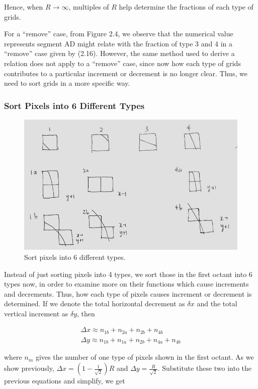 \documentclass[letterpaper]{article}
\numberwithin{equation}{section} %
\numberwithin{figure}{section} %
\numberwithin{table}{section} %
\begin{document}
\noindent
Hence, when $R \rightarrow \infty$, multiples of $R$ help determine the fractions of each type of grids. 



For a \enquote{remove} case, from Figure 2.4, we observe that the numerical value represents segment AD might relate with the fraction of type 3 and 4 in a \enquote{remove} case given by (2.16). However, the same method used to derive a relation does not apply to a \enquote{remove} case, since now how each type of grids contributes to a particular increment or decrement is no longer clear. Thus, we need to sort grids in a more specific way. 



\subsubsection{Sort Pixels into 6 Different Types}

\begin{figure}[h]
	\centering
	\includegraphics[width=0.5\linewidth]{6ty}
	\caption{Sort pixels into 6 different types.}
	\label{fig:6ty}
\end{figure}

Instead of just sorting pixels into 4 types, we sort those in the first octant into 6 types now, in order to examine more on their functions which cause increments and decrements. Thus, how each type of pixels causes increment or decrement is determined. If we denote the total horizontal decrement as $\delta x$ and the total vertical increment as $\delta y$, then

\begin{align} 
\Delta x \approx n_{1b}+n_{2a}+n_{2b}+n_{4b} \\
\Delta y \approx n_{1b}+n_{1a}+n_{2b}+n_{4a}+n_{4b}
\end{align}

\noindent
where $n_{m}$ gives the number of one type of pixels shown in the first octant. As we show previously, $\Delta x=(1-\frac{1}{\sqrt{2}})R$ and $\Delta y=\frac{R}{\sqrt{2}}$. Substitute these two into the previous equations and simplify, we get
\end{document}
